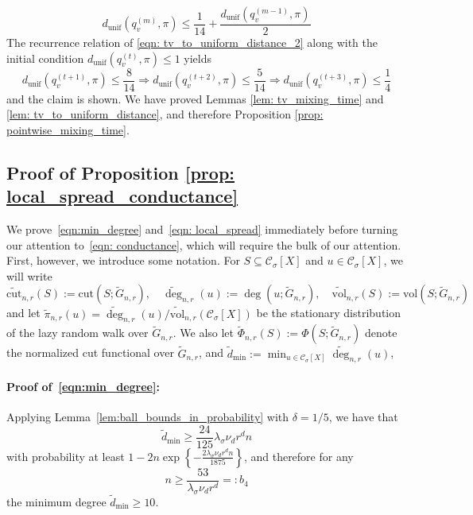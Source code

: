 \documentclass[11pt,twoside]{article}
\theoremstyle{definition}
\newcommand{\set}[1]{\left\{#1\right\}}
\newcommand{\vol}{\mathrm{vol}}
\newcommand{\cut}{\mathrm{cut}}
\newcommand{\1}{\mathbbm{1}}
\newcommand{\Xbf}{X}
\newcommand{\Cset}{\mathcal{C}}
\newcommand{\Csig}{\Cset_{\sigma}}
\newcommand{\degminwt}{\widetilde{d}_{\min}}
\begin{document}
\begin{equation}
d_{\textrm{unif}}(q_v^{(m)}, \pi) \leq \frac{1}{14} + \frac{d_{\textrm{unif}}(q_v^{(m - 1)}, \pi)}{2} \label{eqn: tv_to_uniform_distance_2}
\end{equation}
The recurrence relation of \eqref{eqn: tv_to_uniform_distance_2} along with the initial condition $d_{\textrm{unif}}(q_v^{(t)}, \pi) \leq 1$ yields
\begin{equation*}
d_{\textrm{unif}}(q_v^{(t + 1)}, \pi) \leq \frac{8}{14} \Rightarrow d_{\textrm{unif}}(q_v^{(t + 2)}, \pi) \leq \frac{5}{14} \Rightarrow  d_{\textrm{unif}}(q_v^{(t + 3)}, \pi) \leq \frac{1}{4}
\end{equation*}
and the claim is shown. We have proved Lemmas \ref{lem: tv_mixing_time} and \ref{lem: tv_to_uniform_distance}, and therefore Proposition \ref{prop: pointwise_mixing_time}.

\subsection{Proof of Proposition \ref{prop: local_spread_conductance}}

We prove~\eqref{eqn:min_degree} and~\eqref{eqn: local_spread} immediately before turning our attention to~\eqref{eqn: conductance}, which will require the bulk of our attention. First, however, we introduce some notation. For $S \subseteq \Csig[\Xbf]$ and $u \in \Csig[\Xbf]$, we will write
\begin{equation*}
\widetilde{\cut}_{n,r}(S) := \cut(S; \widetilde{G}_{n,r}), \quad \widetilde{\deg}_{n,r}(u) := \deg(u; \widetilde{G}_{n,r}), \quad 
\widetilde{\vol}_{n,r}(S) := \vol(S; \widetilde{G}_{n,r})
\end{equation*}
and let $\widetilde{\pi}_{n,r}(u) = \widetilde{\deg}_{n,r}(u)/\widetilde{\vol}_{n,r}(\Csig[\Xbf])$ be the stationary distribution of the lazy random walk over $\widetilde{G}_{n,r}$. We also let $\widetilde{\Phi}_{n,r}(S) := \Phi(S; \widetilde{G}_{n,r})$ denote the normalized cut functional over $\widetilde{G}_{n,r}$, and $\degminwt := \min_{u \in \Csig[\Xbf]} \widetilde{\deg}_{n,r}(u)$,

\paragraph{Proof of~\eqref{eqn:min_degree}:}
Applying Lemma~\ref{lem:ball_bounds_in_probability} with $\delta = 1/5$, we have that
\begin{equation*}
\widetilde{d}_{\min} \geq \frac{24}{125} \lambda_{\sigma} \nu_d r^d n
\end{equation*} 
with probability at least $1 - 2n\exp\set{-\frac{2\lambda_{\sigma} \nu_d r^d n}{1875}}$, and therefore for any  
\begin{equation*}
n \geq \frac{53}{\lambda_\sigma \nu_dr^d} =: b_4
\end{equation*}
the minimum degree $\widetilde{d}_{\min} \geq 10$. 
\end{document}
